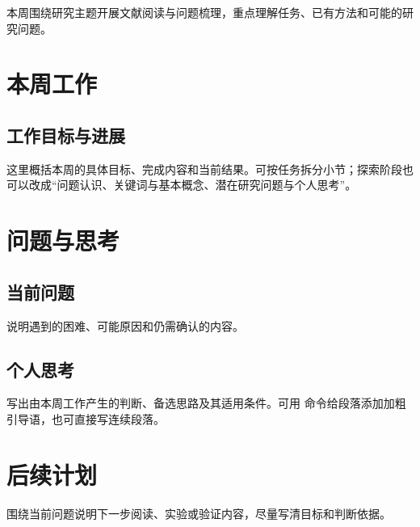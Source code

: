 本周围绕研究主题开展文献阅读与问题梳理，重点理解任务、已有方法和可能的研究问题。

\section{本周工作}
\subsection{工作目标与进展}
这里概括本周的具体目标、完成内容和当前结果。可按任务拆分小节；探索阶段也可以改成“问题认识、关键词与基本概念、潜在研究问题与个人思考”。

\section{问题与思考}
\subsection{当前问题}
说明遇到的困难、可能原因和仍需确认的内容。
\subsection{个人思考}
写出由本周工作产生的判断、备选思路及其适用条件。可用 \texttt{\string\field} 命令给段落添加加粗引导语，也可直接写连续段落。

\section{后续计划}
围绕当前问题说明下一步阅读、实验或验证内容，尽量写清目标和判断依据。
